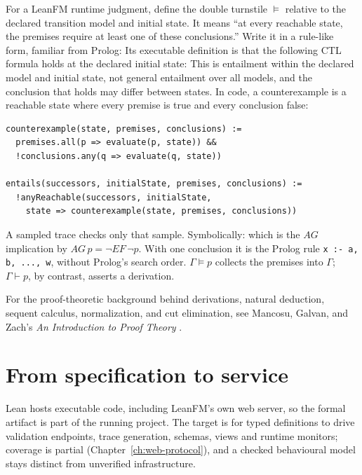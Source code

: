 

For a LeanFM runtime judgment, define the double turnstile $\vDash$ relative
to the declared transition model and initial state. It means ``at every reachable
state, the premises require at least one of these conclusions.'' Write it in a
rule-like form, familiar from Prolog:
Its executable definition is that the following CTL formula holds at the
declared initial state:
This is entailment within the declared model and initial state, not general
entailment over all models, and the conclusion that holds may differ between
states. In code, a counterexample is a reachable state where every premise is true
and every conclusion false:
\begin{lstlisting}
counterexample(state, premises, conclusions) :=
  premises.all(p => evaluate(p, state)) &&
  !conclusions.any(q => evaluate(q, state))

entails(successors, initialState, premises, conclusions) :=
  !anyReachable(successors, initialState,
    state => counterexample(state, premises, conclusions))
\end{lstlisting}
A sampled trace checks only that sample. Symbolically:
which is the $AG$ implication by $AG\,p=\neg EF\,\neg p$. With one conclusion it is
the Prolog rule \texttt{x :- a, b, ..., w}, without Prolog's search order.
$\Gamma\vDash p$ collects the premises into $\Gamma$; $\Gamma\vdash p$, by
contrast, asserts a derivation.

For the proof-theoretic background behind derivations, natural deduction,
sequent calculus, normalization, and cut elimination, see Mancosu, Galvan, and
Zach's \emph{An Introduction to Proof Theory} \citep{mancosu2021proof}.

\section{From specification to service}

Lean hosts executable code, including LeanFM's own web server, so the formal
artifact is part of the running project. The target is for typed definitions to
drive validation endpoints, trace generation, schemas, views and runtime monitors;
coverage is partial (Chapter~\ref{ch:web-protocol}), and a checked behavioural
model stays distinct from unverified infrastructure.
